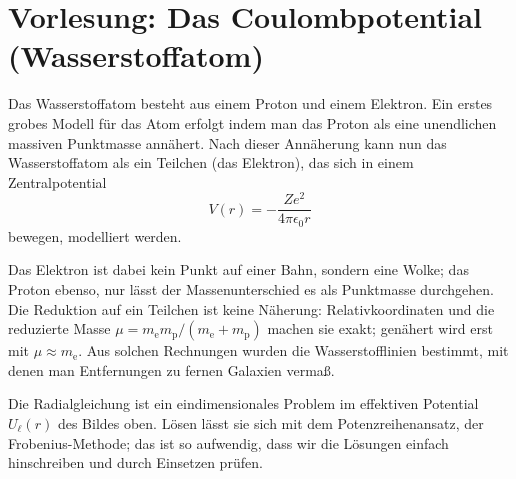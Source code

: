 
\section{Vorlesung: Das Coulombpotential (Wasserstoffatom)}



Das Wasserstoffatom besteht aus einem Proton und einem Elektron. Ein erstes grobes Modell für das Atom erfolgt indem man das Proton als eine unendlichen massiven Punktmasse annähert. Nach dieser Annäherung kann nun das Wasserstoffatom als ein Teilchen (das Elektron), das sich in einem Zentralpotential 
\begin{equation}
	V(r) = -\frac{Ze^2}{4\pi \epsilon_0 r}
\end{equation}
bewegen, modelliert werden.

Das Elektron ist dabei kein Punkt auf einer Bahn, sondern eine Wolke; das Proton
ebenso, nur lässt der Massenunterschied es als Punktmasse durchgehen. Die Reduktion
auf ein Teilchen ist keine Näherung: Relativkoordinaten und die reduzierte Masse
$\mu = m_{\text{e}}m_{\text{p}}/(m_{\text{e}}+m_{\text{p}})$ machen sie exakt;
genähert wird erst mit $\mu \approx m_{\text{e}}$. Aus solchen Rechnungen wurden
die Wasserstofflinien bestimmt, mit denen man Entfernungen zu fernen Galaxien
vermaß.

Die Radialgleichung ist ein eindimensionales Problem im effektiven Potential
$U_\ell(r)$ des Bildes oben. Lösen lässt sie sich mit dem Potenzreihenansatz, der
Frobenius-Methode; das ist so aufwendig, dass wir die Lösungen einfach
hinschreiben und durch Einsetzen prüfen.


